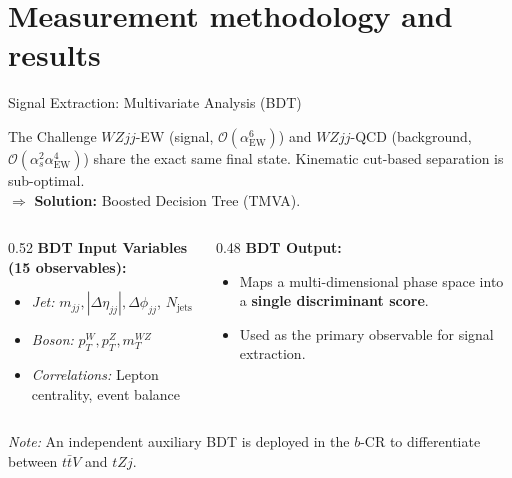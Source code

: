 \section{Measurement methodology and results}
\begin{frame}{Signal Extraction: Multivariate Analysis (BDT)}
    
    \begin{block}{The Challenge}
        $WZjj$-EW (signal, $\mathcal{O}(\alpha_{\text{EW}}^6)$) and $WZjj$-QCD (background, $\mathcal{O}(\alpha_s^2 \alpha_{\text{EW}}^4)$) share the exact same final state. Kinematic cut-based separation is sub-optimal.
        \\ \vspace{0.1cm}
        $\Rightarrow$ \textbf{Solution:} Boosted Decision Tree (TMVA).
    \end{block}
    
    \vspace{0.2cm}
    
    \begin{columns}[T]
        \begin{column}{0.52\textwidth}
            \textbf{BDT Input Variables (15 observables):}
            \begin{itemize}
                \item \textit{Jet:} $m_{jj}, |\Delta\eta_{jj}|, \Delta\phi_{jj}$, $N_{\text{jets}}$
                \item \textit{Boson:} $p_T^W, p_T^Z, m_T^{WZ}$
                \item \textit{Correlations:} Lepton centrality, event balance
            \end{itemize}
        \end{column}
        
        \begin{column}{0.48\textwidth}
            \textbf{BDT Output:}
            \begin{itemize}
                \item Maps a multi-dimensional phase space into a \textbf{single discriminant score}.
                \item Used as the primary observable for signal extraction.
            \end{itemize}
        \end{column}
    \end{columns}
    \vspace{0.2cm}
    \begin{center}
        \small{\textit{Note:} An independent auxiliary BDT is deployed in the $b$-CR to differentiate between $t\bar{t}V$ and $tZj$.}
    \end{center}
    
\end{frame}

